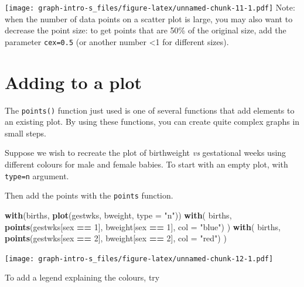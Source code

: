\documentclass[
]{book}
\newenvironment{Shaded}{\begin{snugshade}}{\end{snugshade}}
\newcommand{\AttributeTok}[1]{\textcolor[rgb]{0.13,0.29,0.53}{#1}}
\newcommand{\DecValTok}[1]{\textcolor[rgb]{0.00,0.00,0.81}{#1}}
\newcommand{\FunctionTok}[1]{\textcolor[rgb]{0.13,0.29,0.53}{\textbf{#1}}}
\newcommand{\NormalTok}[1]{#1}
\newcommand{\SpecialCharTok}[1]{\textcolor[rgb]{0.81,0.36,0.00}{\textbf{#1}}}
\newcommand{\StringTok}[1]{\textcolor[rgb]{0.31,0.60,0.02}{#1}}
\begin{document}
\texttt{[image: graph-intro-s\_files/figure-latex/unnamed-chunk-11-1.pdf]}
Note: when the number of data points on a scatter plot is large, you may also want to decrease the point size: to get points that are 50\% of the original size, add the parameter \texttt{cex=0.5} (or another number \textless1 for different sizes).

\section{Adding to a plot}\label{adding-to-a-plot}

The \texttt{points()} function just used is one of several functions
that add elements to an existing plot. By using these functions, you
can create quite complex graphs in small steps.

Suppose we wish to recreate the plot of birthweight \emph{vs} gestational
weeks using different colours for male and female babies. To start with
an empty plot, with \texttt{type=\textquotesingle{}n\textquotesingle{}} argument.

Then add the points with the \texttt{points} function.

\begin{Shaded}
\begin{Highlighting}[]
\FunctionTok{with}\NormalTok{(births, }\FunctionTok{plot}\NormalTok{(gestwks, bweight, }\AttributeTok{type =} \StringTok{"n"}\NormalTok{))}
\FunctionTok{with}\NormalTok{(}
\NormalTok{  births, }
  \FunctionTok{points}\NormalTok{(gestwks[sex }\SpecialCharTok{==} \DecValTok{1}\NormalTok{], bweight[sex }\SpecialCharTok{==} \DecValTok{1}\NormalTok{], }\AttributeTok{col =} \StringTok{"blue"}\NormalTok{)}
\NormalTok{)}
\FunctionTok{with}\NormalTok{(}
\NormalTok{  births, }
  \FunctionTok{points}\NormalTok{(gestwks[sex }\SpecialCharTok{==} \DecValTok{2}\NormalTok{], bweight[sex }\SpecialCharTok{==} \DecValTok{2}\NormalTok{], }\AttributeTok{col =} \StringTok{"red"}\NormalTok{)}
\NormalTok{)}
\end{Highlighting}
\end{Shaded}

\texttt{[image: graph-intro-s\_files/figure-latex/unnamed-chunk-12-1.pdf]}

To add a legend explaining the colours, try
\end{document}
